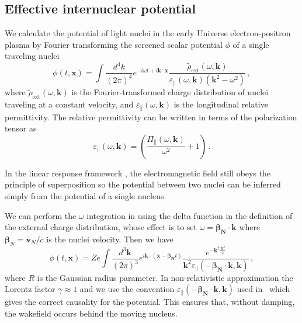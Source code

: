 \subsection{Effective internuclear potential}\label{sec:potential}
We calculate the potential of light nuclei in the early Universe electron-positron plasma by Fourier transforming the screened scalar potential $\phi$ of a single traveling nuclei 
\begin{equation}\label{eq:potent}
 \phi(t,\boldsymbol{x}) = \int \frac{d^4k}{(2\pi)^4} e^{-i\omega t+ i\boldsymbol{k}\cdot\boldsymbol{x}} \frac{\widetilde{\rho}_\text{ext}(\omega,\boldsymbol{k})}{\varepsilon_\parallel(\omega,\boldsymbol{k})(\boldsymbol{k}^2-\omega^2) }\,,
\end{equation}
where $\widetilde{\rho}_{\text{ext}}(\omega,\boldsymbol{k})$ is the Fourier-transformed charge distribution of nuclei traveling at a constant velocity, and $\varepsilon_\parallel(\omega,\boldsymbol{k})$ is the longitudinal relative permittivity. The relative permittivity can be written in terms of the polarization tensor as
\begin{equation}\label{eq:epsilon}
 \varepsilon_\parallel(\omega,\boldsymbol{k})= \left(\frac{\Pi_{\parallel}(\omega,\boldsymbol{k})}{ \omega^2}+1\right)\,.
\end{equation}

In the linear response framework , the electromagnetic field still obeys the principle of superposition so the potential between two nuclei can be inferred simply from the potential of a single nucleus. 

We can perform the $\omega$ integration in  using the delta function in the definition of the external charge distribution, whose effect is to set $\omega = \boldsymbol{\beta_{\text{N}}}\cdot \boldsymbol{k}$ where $\boldsymbol{\beta}_N = \boldsymbol{v}_N/c$ is the nuclei velocity. Then we have
\begin{equation}\label{eq:potentk}
 \phi(t,\boldsymbol{x}) = Ze\int \frac{d^3\boldsymbol{k}}{(2\pi)^3} e^{ i\boldsymbol{k}\cdot(\boldsymbol{x}-\boldsymbol{\beta_{\text{N}}} t)} \frac{ e^{-\boldsymbol{k}^2\frac{R^2}{4}}}{\boldsymbol{k}^2\varepsilon_\parallel(-\boldsymbol{\beta_{\text{N}}} \cdot \boldsymbol{k},\boldsymbol{k}) }\,,
\end{equation}
where $R$ is the Gaussian radius parameter.
In non-relativistic approximation the Lorentz factor $\gamma \approx 1$ and we use the convention $\varepsilon_\parallel(-\boldsymbol{\beta_{\text{N}}} \cdot \boldsymbol{k},\boldsymbol{k})$ used in~\cite{Montgomery:1970jpp,Stenflo:1973,Shukla:2002ppcf,Shukla:1996ccc} which gives the correct causality for the potential. This ensures that, without damping, the wakefield occurs behind the moving nucleus.


